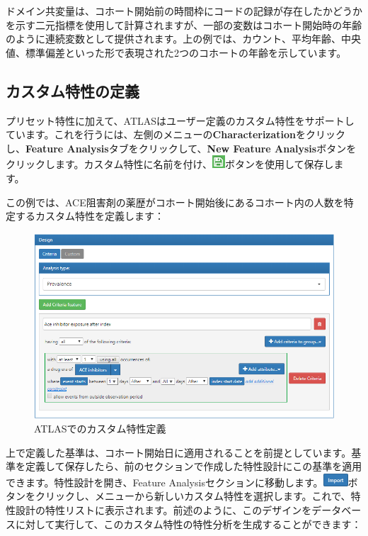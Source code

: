 \documentclass[
  11pt]{book}
\theoremstyle{definition}
\theoremstyle{definition}
\theoremstyle{definition}
\theoremstyle{definition}
\theoremstyle{remark}
\begin{document}
ドメイン共変量は、コホート開始前の時間枠にコードの記録が存在したかどうかを示す二元指標を使用して計算されますが、一部の変数はコホート開始時の年齢のように連続変数として提供されます。上の例では、カウント、平均年齢、中央値、標準偏差といった形で表現された2つのコホートの年齢を示しています。

\subsection{カスタム特性の定義}\label{ux30abux30b9ux30bfux30e0ux7279ux6027ux306eux5b9aux7fa9}

プリセット特性に加えて、ATLASはユーザー定義のカスタム特性をサポートしています。これを行うには、左側のメニューの\textbf{Characterization}をクリックし、\textbf{Feature Analysis}タブをクリックして、\textbf{New Feature Analysis}ボタンをクリックします。カスタム特性に名前を付け、\includegraphics{images/PopulationLevelEstimation/save.png}ボタンを使用して保存します。

この例では、ACE阻害剤の薬歴がコホート開始後にあるコホート内の人数を特定するカスタム特性を定義します：

\begin{figure}

{\centering \includegraphics[width=1\linewidth]{images/Characterization/atlasCharacterizationCustomFeature} 

}

\caption{ATLASでのカスタム特性定義}\label{fig:atlasCharacterizationCustomFeature}
\end{figure}

上で定義した基準は、コホート開始日に適用されることを前提としています。基準を定義して保存したら、前のセクションで作成した特性設計にこの基準を適用できます。特性設計を開き、Feature Analysisセクションに移動します。\includegraphics{images/Characterization/atlasImportButton.png}ボタンをクリックし、メニューから新しいカスタム特性を選択します。これで、特性設計の特性リストに表示されます。前述のように、このデザインをデータベースに対して実行して、このカスタム特性の特性分析を生成することができます：
\end{document}
